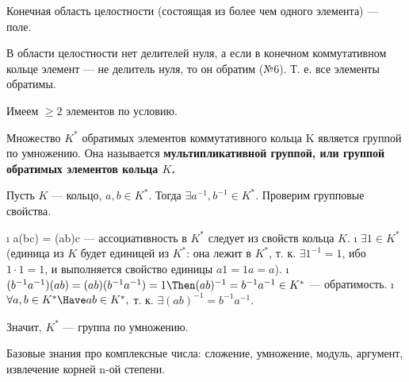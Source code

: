 \begin{problem}[7]
Конечная область целостности (состоящая из более чем одного элемента) --- поле.
\end{problem}

\begin{solution}
В области целостности нет делителей нуля, а если в конечном коммутативном кольце элемент --- не делитель нуля, то он обратим (№6). Т. е. все элементы обратимы.

Имеем \(\ge 2\) элементов по условию.
\end{solution}

\begin{problem}[8]
Множество $K^*$ обратимых элементов коммутативного кольца K является группой по умножению. Она называется \bf{мультипликативной группой}, или \bf{группой обратимых элементов} кольца $K$.
\end{problem}

\begin{solution}
Пусть \(K\) --- кольцо, \(a, b \in K^*\). Тогда \(\exists a^{-1}, b^{-1} \in K^*\). Проверим групповые свойства.

\begin{enumerate}
\def\labelenumi{\arabic{enumi}.}
\tightlist
\i
  a(bc) = (ab)c --- ассоциативность в \(K^*\) следует из свойств кольца \(K\).
\i
  \(\exists 1 \in K^*\) (единица из $K$ будет единицей из $K^*$: она лежит в $K^*$, т. к. $\exists 1^{-1} = 1$, ибо $1\cdot 1 = 1$, и выполняется свойство единицы $a1=1a=a$).
\i
  \((b^{-1}a^{-1})(ab) = (ab)(b^{-1}a^{-1})=1 \Then (ab)^{-1} = b^{-1} a^{-1} \in K^*\) --- обратимость.
\i
  \(\forall a, b \in K^* \Have ab \in K^*,\) т. к. $\exists (ab)^{-1} = b^{-1}a^{-1}$.
\end{enumerate}

Значит, \(K^*\) --- группа по умножению.
\end{solution}

\begin{problem}[9(1.5-1.7)]
Базовые знания про комплексные числа: сложение, умножение, модуль, аргумент, извлечение корней n-ой степени.
\end{problem}

